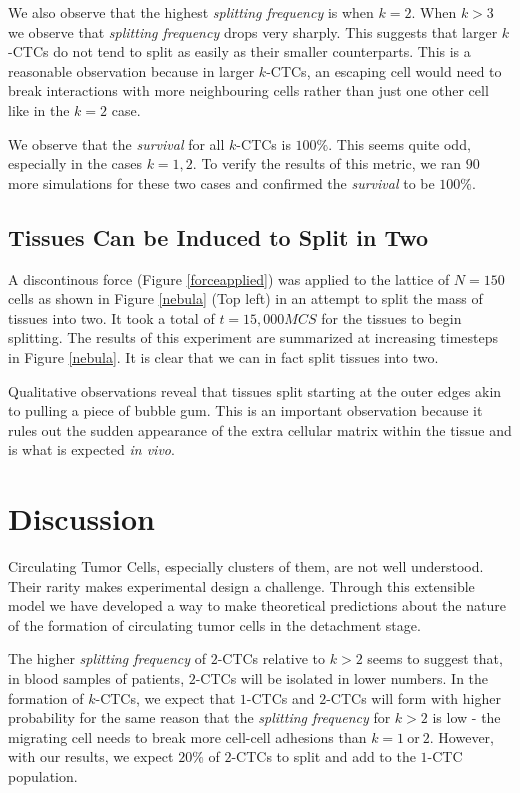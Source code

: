 \documentclass[12pt]{article}
\begin{document}
We also observe that the highest \emph{splitting frequency} is when $k=2$. When $k>3$ we observe that \emph{splitting frequency} drops very sharply. This suggests that larger $k$-CTCs do not tend to split as easily as their smaller counterparts. This is a reasonable observation because in larger $k$-CTCs, an escaping cell would need to break interactions with more neighbouring cells rather than just one other cell like in the $k=2$ case.

We observe that the \emph{survival} for all $k$-CTCs is $100\%$. This seems quite odd, especially in the cases $k=1,2$. To verify the results of this metric, we ran $90$ more simulations for these two cases and confirmed the \emph{survival} to be $100\%$.

\subsection{Tissues Can be Induced to Split in Two}
A discontinous force (Figure \ref{forceapplied}) was applied to the lattice of $N=150$ cells as shown in Figure \ref{nebula} (Top left) in an attempt to split the mass of tissues into two. It took a total of $t=15,000MCS$ for the tissues to begin splitting. The results of this experiment are summarized at increasing timesteps in Figure \ref{nebula}. It is clear that we can in fact split tissues into two.

Qualitative observations reveal that tissues split starting at the outer edges akin to pulling a piece of bubble gum. This is an important observation because it rules out the sudden appearance of the extra cellular matrix within the tissue and is what is expected \emph{in vivo}.
\section{Discussion}
Circulating Tumor Cells, especially clusters of them, are not well understood. Their rarity makes experimental design a challenge. Through this extensible model we have developed a way to make theoretical predictions about the nature of the formation of circulating tumor cells in the detachment stage. 

The higher \emph{splitting frequency} of $2$-CTCs relative to $k>2$ seems to suggest that, in blood samples of patients, $2$-CTCs will be isolated in lower numbers. In the formation of $k$-CTCs, we expect that $1$-CTCs and $2$-CTCs will form with higher probability for the same reason that the \emph{splitting frequency} for $k>2$ is low - the migrating cell needs to break more cell-cell adhesions than $k=1~\text{or}~2$. However, with our results, we expect $20\%$ of $2$-CTCs to split and add to the $1$-CTC population.
\end{document}

